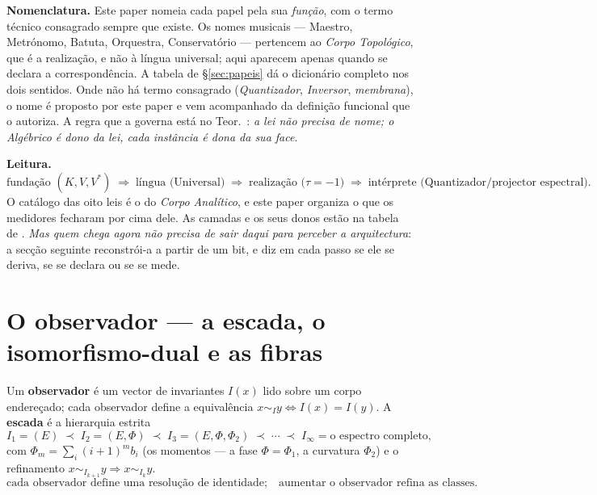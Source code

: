 \documentclass[livro.tex]{subfiles}
\begin{document}
\medskip
\noindent\textbf{Nomenclatura.} Este paper nomeia cada papel pela sua
\emph{função}, com o termo técnico consagrado sempre que existe. Os
nomes musicais --- Maestro, Metrónomo, Batuta, Orquestra,
Conservatório --- pertencem ao \emph{Corpo Topológico}, que é a
realização, e não à língua universal; aqui aparecem apenas quando se
declara a correspondência. A tabela de \S\ref{sec:papeis} dá o
dicionário completo nos dois sentidos. Onde não há termo consagrado
(\emph{Quantizador}, \emph{Inversor}, \emph{membrana}), o nome é
proposto por este paper e vem acompanhado da definição funcional que o
autoriza. A regra que a governa está no
Teor.~: \emph{a lei não precisa de
nome; o Algébrico é dono da lei, cada instância é dona da sua face}.

\medskip
\noindent\textbf{Leitura.}
\[
\boxed{
\text{fundação }(K,V,V^{*})
\;\Longrightarrow\;
\text{língua (Universal)}
\;\Longrightarrow\;
\text{realização ($\tau=-1$)}
\;\Longrightarrow\;
\text{intérprete (Quantizador/projector espectral)}.
}
\]
O catálogo das oito leis é o do \emph{Corpo Analítico}, e este paper
organiza o que os medidores fecharam por cima dele. As camadas e os seus
donos estão na tabela de . \emph{Mas quem chega
agora não precisa de sair daqui para perceber a arquitectura}: a secção
seguinte reconstrói-a a partir de um bit, e diz em cada passo se ele se
deriva, se se declara ou se se mede.

\section{O observador --- a escada, o isomorfismo-dual e as fibras}\label{sec:observador}

\begin{definicao}\label{def:observador}
Um \textbf{observador} é um vector de invariantes
$I(x)$ lido sobre um corpo endereçado; cada observador define a
equivalência $x\sim_{I}y\iff I(x)=I(y)$. A \textbf{escada} é a
hierarquia estrita
\[
\boxed{
I_1=(E)\;\prec\;I_2=(E,\Phi)\;\prec\;I_3=(E,\Phi,\Phi_2)\;\prec\;\cdots
\;\prec\;I_\infty=\text{o espectro completo},
}
\]
com $\Phi_m=\sum_i (i{+}1)^m b_i$ (os momentos --- a fase $\Phi=\Phi_1$,
a curvatura $\Phi_2$) e o refinamento
$x\sim_{I_{k+1}}y\Rightarrow x\sim_{I_k}y$.
\[
\boxed{
\text{cada observador define uma resolução de identidade;}
\quad
\text{aumentar o observador refina as classes.}
}
\]
\end{definicao}
\end{document}
